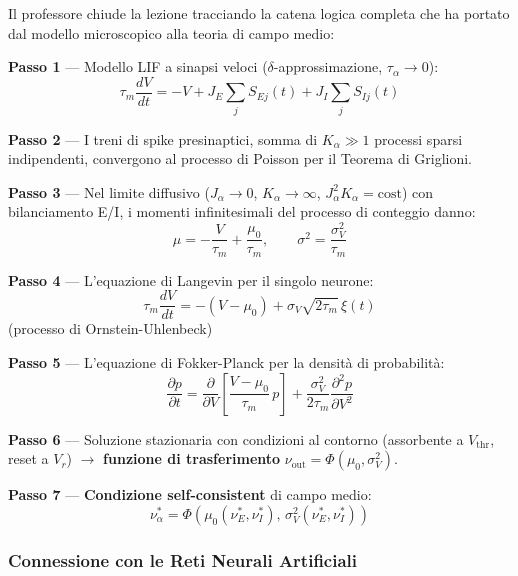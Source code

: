 Il professore chiude la lezione tracciando la catena logica completa che ha portato dal modello microscopico alla teoria di campo medio:

\textbf{Passo 1} — Modello LIF a sinapsi veloci ($\delta$-approssimazione, $\tau_\alpha \to 0$):
\begin{equation}
\tau_m \frac{dV}{dt} = -V + J_E \sum_j S_{Ej}(t) + J_I \sum_j S_{Ij}(t)
\end{equation}

\textbf{Passo 2} — I treni di spike presinaptici, somma di $K_\alpha \gg 1$ processi sparsi indipendenti, convergono al processo di Poisson per il Teorema di Griglioni.

\textbf{Passo 3} — Nel limite diffusivo ($J_\alpha \to 0$, $K_\alpha \to \infty$, $J_\alpha^2 K_\alpha = \text{cost}$) con bilanciamento E/I, i momenti infinitesimali del processo di conteggio danno:
\begin{equation}
\mu = -\frac{V}{\tau_m} + \frac{\mu_0}{\tau_m}, \qquad \sigma^2 = \frac{\sigma_V^2}{\tau_m}
\end{equation}

\textbf{Passo 4} — L'equazione di Langevin per il singolo neurone:
\begin{equation}
\tau_m \frac{dV}{dt} = -(V - \mu_0) + \sigma_V \sqrt{2\tau_m}\, \xi(t)
\end{equation}
(processo di Ornstein-Uhlenbeck)

\textbf{Passo 5} — L'equazione di Fokker-Planck per la densità di probabilità:
\begin{equation}
\frac{\partial p}{\partial t} = \frac{\partial}{\partial V}\left[\frac{V - \mu_0}{\tau_m}\, p\right] + \frac{\sigma_V^2}{2\tau_m}\frac{\partial^2 p}{\partial V^2}
\end{equation}

\textbf{Passo 6} — Soluzione stazionaria con condizioni al contorno (assorbente a $V_{\text{thr}}$, reset a $V_r$) $\rightarrow$ \textbf{funzione di trasferimento} $\nu_{\text{out}} = \Phi(\mu_0, \sigma_V^2)$.

\textbf{Passo 7} — \textbf{Condizione self-consistent} di campo medio:
\begin{equation}
\nu_\alpha^* = \Phi\!\left(\mu_0(\nu_E^*, \nu_I^*),\, \sigma_V^2(\nu_E^*, \nu_I^*)\right)
\end{equation}

\subsubsection{Connessione con le Reti Neurali Artificiali}


